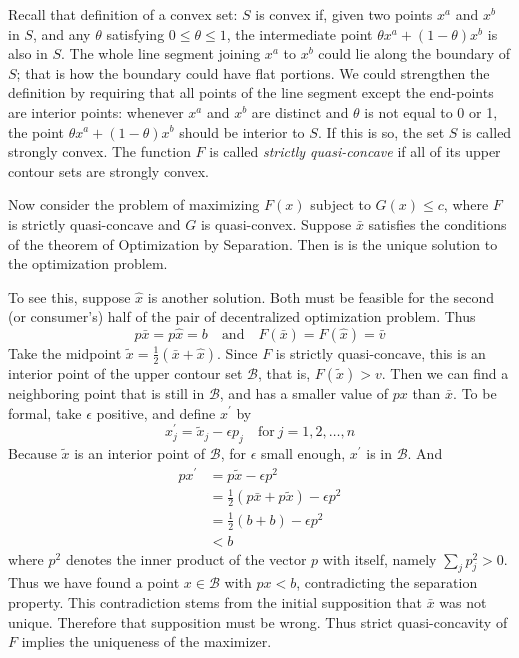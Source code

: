 Recall that definition of a convex set: $S$ is convex if, given two points $x^a$ and $x^b$ in $S$, and any $\theta$ satisfying $0 \leq \theta \leq 1$, the intermediate point $\theta x^a + (1-\theta)x^b$ is also in $S$. The whole line segment joining $x^a$ to $x^b$ could lie along the boundary of $S$; that is how the boundary could have flat portions. We could strengthen the definition by requiring that all points of the line segment except the end-points are interior points: whenever $x^a$ and $x^b$ are distinct and $\theta$ is not equal to 0 or 1, the point $\theta x^a + (1-\theta)x^b$  should be interior to $S$. If this is so, the set $S$ is called strongly convex. The function $F$ is called \textit{strictly quasi-concave} if all of its upper contour sets are strongly convex.

Now consider the problem of maximizing $F(x)$ subject to $G(x) \leq c$, where $F$ is strictly quasi-concave and $G$ is quasi-convex. Suppose $\bar{x}$ satisfies the conditions of the theorem of Optimization by Separation. Then is is the unique solution to the optimization problem.

To see this, suppose $\hat{x}$ is another solution. Both must be feasible for the second (or consumer's) half of the pair of decentralized optimization problem. Thus
\begin{equation*}
p \bar{x} = p \hat{x} =b  \quad \mbox{and} \quad F(\bar{x}) = F(\hat{x})  = \bar{v}
\end{equation*}
Take the midpoint $\tilde{x} = \frac{1}{2} (\bar{x} + \hat{x})$. Since $F$ is strictly quasi-concave, this is an interior point of the upper contour set $\mathcal{B}$, that is, $F(\tilde{x}) > v$. Then we can find a neighboring point that is still in $\mathcal{B}$, and has a smaller value of $px$ than $\bar{x}$. To be formal, take $\epsilon$ positive, and define $x^\prime$ by
\begin{equation*}
 x^{\prime}_j = \tilde{x}_j - \epsilon p_j \quad \mbox{for} \  j=1,2,\dots,n
\end{equation*}
Because $\tilde{x}$ is an interior point of $\mathcal{B}$, for $\epsilon$ small enough, $x^\prime$ is in $\mathcal{B}$. And 
\begin{equation*}
\begin{array}{rl}
p x^\prime & = p \tilde{x} - \epsilon p^2 \\
   & = \frac{1}{2}(p \bar{x} + p \tilde{x} ) - \epsilon p^2\\
   & = \frac{1}{2}(b+b) - \epsilon p^2 \\
   & < b
\end{array} 
\end{equation*}
where $p^2$ denotes the inner product of the vector $p$ with itself, namely $\sum_j p_j^2 > 0$. Thus we have found a point $x \in \mathcal{B}$ with $px <b$, contradicting the separation property. This contradiction stems from the initial supposition that $\bar{x}$ was not unique. Therefore that supposition must be wrong. Thus strict quasi-concavity of $F$ implies the uniqueness of the maximizer.


